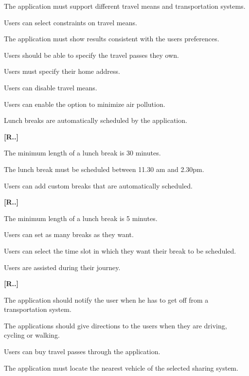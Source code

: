 \begin{list}
\begin{list}
	{
	}
\item The application must support different travel means and transportation systems.
\item Users can select constraints on travel means.
\item The application must show results consistent with the users preferences.
\item Users should be able to specify the travel passes they own.
\item Users must specify their home address.
	\item Users can disable travel means.
	\item Users can enable the option to minimize air pollution.
    \end{list}
\item Lunch breaks are automatically scheduled by the application.
\begin{list}
	{\bfseries{}[R..]~}
	{
	}
\item The minimum length of a lunch break is 30 minutes.
\item The lunch break must be scheduled between 11.30 am and 2.30pm.
\end{list}
\item Users can add custom breaks that are automatically scheduled.
\begin{list}
	{\bfseries{}[R..]~}
	{
	}
\item The minimum length of a lunch break is 5 minutes.
\item Users can set as many breaks as they want.
\item Users can select the time slot in which they want their break to be scheduled.
\end{list}
\item Users are assisted during their journey.
\begin{list}
	{\bfseries{}[R..]~}
	{
	}
\item The application should notify the user when he has to get off from a transportation system.
\item The applications should give directions to the users when they are driving, cycling or walking.
\item Users can buy travel passes through the application.
\item The application must locate the nearest vehicle of the selected sharing system.
\end{list}
\end{list}

